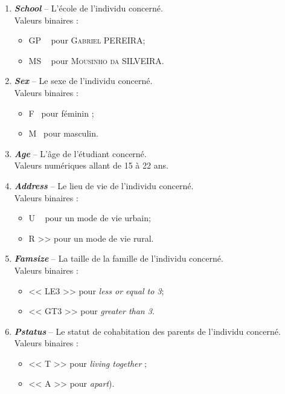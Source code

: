 \documentclass[11pt]{article}
\begin{document}
\renewcommand{\labelenumi}{\textbf{\theenumi.}}
\renewcommand{\labelenumii}{\textbf{\theenumii.}}
\renewcommand{\theenumi}{\arabic{enumi}}
\renewcommand{\theenumii}{\alph{enumii}}
\begin{enumerate}
\item \textbf{\emph{School}} \--- L'école de l'individu concerné.
	\\\textsf{Valeurs binaires : }\begin{itemize}
	\item[\textbullet] \og GP \fg~ pour \textsc{Gabriel PEREIRA};
	\item[\textbullet] \og MS \fg~ pour \textsc{Mousinho da SILVEIRA}.
	\end{itemize}

\item \textbf{\emph{Sex}} \--- Le sexe de l'individu concerné.
	\\\textsf{Valeurs binaires : }\begin{itemize}
	\item[\textbullet] \og F \fg~pour féminin ;
	\item[\textbullet] \og M \fg~pour masculin.
	\end{itemize}

\item \textbf{\emph{Age}} \--- L'âge de l'étudiant concerné.
	\\\textsf{Valeurs numériques allant de 15 à 22 ans}.

\item \textbf{\emph{Address}} \--- Le lieu de vie de l'individu concerné.
	\\\textsf{Valeurs binaires : }\begin{itemize}
	\item[\textbullet] \og U \fg~ pour un mode de vie urbain;
	\item[\textbullet] \og R >> pour un mode de vie rural.
	\end{itemize}

\item  \textbf{\emph{Famsize}} \--- La taille de la famille de l'individu concerné.
	\\\textsf{Valeurs binaires : }\begin{itemize}
	\item[\textbullet] << LE3 >>  pour \emph{less or equal to 3};
	\item[\textbullet] << GT3 >> pour \emph{greater than 3}.
	\end{itemize}


\item \textbf{\emph{Pstatus}} \--- Le statut de cohabitation des parents de l'individu concerné.
	\\\textsf{Valeurs binaires : }\begin{itemize}
	\item[\textbullet] << T >> pour \emph{living together} ;
	\item[\textbullet] << A >> pour \emph{apart}).
	\end{itemize}


\end{enumerate}
\end{document}
